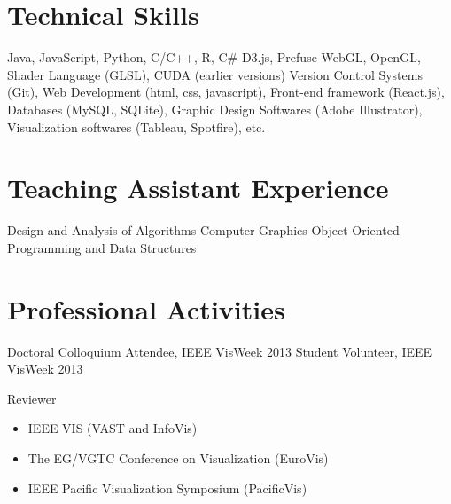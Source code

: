 \documentclass[10pt,a4paper,roman]{moderncv} %
\begin{document}
\section{Technical Skills}

 {Java, JavaScript, Python, C/C++, R, C\#}
 {D3.js, Prefuse}
 {WebGL, OpenGL, Shader Language (GLSL), CUDA (earlier versions)}
 {Version Control Systems (Git), Web Development (html, css, javascript), Front-end framework (React.js), Databases (MySQL, SQLite), Graphic Design Softwares (Adobe Illustrator), Visualization softwares (Tableau, Spotfire), etc.}



\section{Teaching Assistant Experience}

 {Design and Analysis of Algorithms}
 {Computer Graphics}
 {Object-Oriented Programming and Data Structures}





\section{Professional Activities}

\cvitem{} {Doctoral Colloquium Attendee, IEEE VisWeek 2013}
\cvitem{} {Student Volunteer, IEEE VisWeek 2013}
\cvitem{} {Reviewer
\vspace{0.1cm}
\begin{itemize}
\item IEEE VIS (VAST and InfoVis)
\item The EG/VGTC Conference on Visualization (EuroVis)
\item IEEE Pacific Visualization Symposium (PacificVis)
\end{itemize}
}
\end{document}

